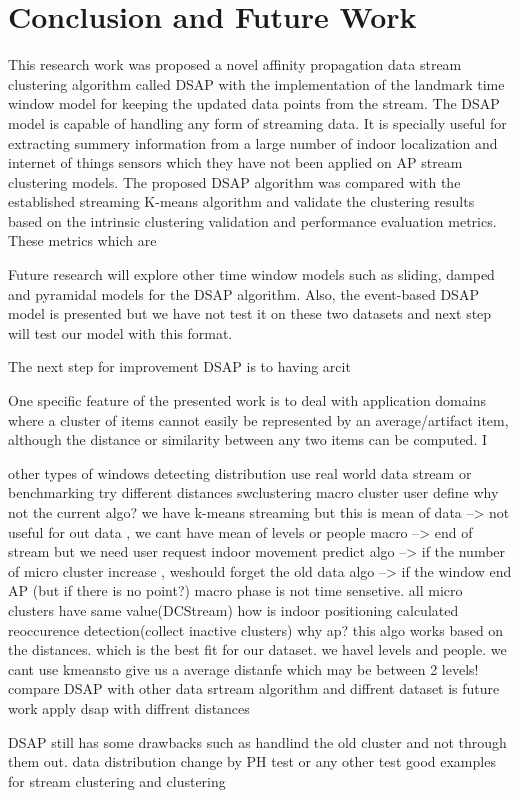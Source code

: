 \setlength{\parindent}{2em}

% 
\chapter{Conclusion and Future Work}

This research work was proposed a novel affinity propagation data stream clustering algorithm called DSAP with the implementation of the landmark time window model for keeping the updated data points from the stream. The DSAP model is capable of handling any form of streaming data. It is specially useful for extracting summery information from a large number of indoor localization and internet of things sensors which they have not been applied on AP stream clustering models.
The proposed DSAP algorithm was compared with the established streaming K-means algorithm and validate the clustering results based on the intrinsic clustering validation and performance evaluation metrics. These metrics which are 

Future research will explore other time window models such as sliding, damped and pyramidal models for the DSAP algorithm. Also, the event-based DSAP model is presented but we have not test it on these two datasets and next step will test our model with this format.

The next step for improvement DSAP is to having arcit


One specific feature of the presented work is to deal with application domains where a cluster of items cannot easily be represented by an average/artifact item, although the distance or similarity between any two items can be computed. I

other types of windows
detecting distribution
use real world data stream or benchmarking
try different distances 
swclustering
macro cluster user define
why not the current algo? we have k-means streaming but this is mean of data --> not useful for out data , we cant have mean of levels or people
macro --> end of stream but we need user request
indoor movement predict
algo --> if the number of micro cluster increase , weshould forget the old data
algo --> if the window end AP (but if there is no point?)
macro phase is not time sensetive. all micro clusters have same value(DCStream)
how is indoor positioning calculated
reoccurence detection(collect inactive clusters)
why ap? this algo works based on the distances. which is the best fit for our dataset. we havel levels and people. we cant use kmeansto give us a average distanfe which may be between 2 levels!
compare DSAP with other data srtream algorithm and diffrent dataset is future work
apply dsap with diffrent distances

DSAP still has some drawbacks such as handlind the old cluster and not through them out.
data distribution change by PH test or any other test
% 
good examples for stream clustering and clustering
